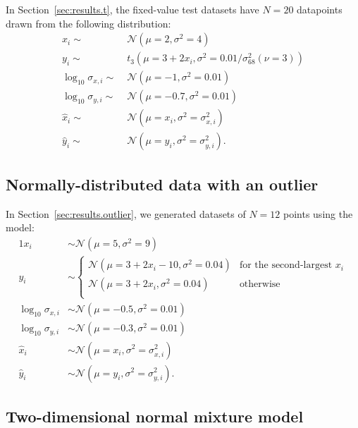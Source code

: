 \documentclass[fleqn,usenatbib]{rasti}
\begin{document}
In Section~\ref{sec:results.t}, the fixed-value test datasets have $N = 20$
datapoints drawn from the following distribution:
\begin{align}
    x_i \sim&\; \mathcal N (\mu = 2, \sigma^2 = 4) \\
    y_i \sim&\; t_{3} (\mu = 3 + 2 x_i, \sigma^2 = 0.01 / \sigma_{68}^2(\nu = 3)) \\
    \log_{10} \sigma_{x, i} \sim&\; \mathcal N (\mu = -1, \sigma^2 = 0.01) \\
    \log_{10} \sigma_{y, i} \sim&\; \mathcal N (\mu = -0.7, \sigma^2 = 0.01) \\
    \hat{x}_i \sim&\; \mathcal N (\mu = x_i, \sigma^2 = \sigma_{x, i}^2) \\
    \hat{y}_i \sim&\; \mathcal N (\mu = y_i, \sigma^2 = \sigma_{y, i}^2).
\end{align}

\subsection{Normally-distributed data with an outlier}
\label{sec:data-models.outlier}

In Section~\ref{sec:results.outlier}, we generated datasets of $N = 12$ points
using the model:
\begin{alignat}{1}
    x_i& \sim \mathcal N (\mu = 5, \sigma^2 = 9) \\
    y_i& \sim
    \begin{cases}
        \mathcal N (\mu = 3 + 2 x_i - 10, \sigma^2 = 0.04) &
            \text{for the second-largest $x_i$} \\
        \mathcal N (\mu = 3 + 2 x_i, \sigma^2 = 0.04) &
            \text{otherwise} \\
    \end{cases}\\
    \log_{10} \sigma_{x, i}& \sim \mathcal N (\mu = -0.5, \sigma^2 = 0.01) \\
    \log_{10} \sigma_{y, i}& \sim \mathcal N (\mu = -0.3, \sigma^2 = 0.01) \\
    \hat{x}_i& \sim \mathcal N (\mu = x_i, \sigma^2 = \sigma_{x, i}^2) \\
    \hat{y}_i& \sim \mathcal N (\mu = y_i, \sigma^2 = \sigma_{y, i}^2).
\end{alignat}

\subsection{Two-dimensional normal mixture model}
\label{sec:data-models.gmm}
\end{document}
